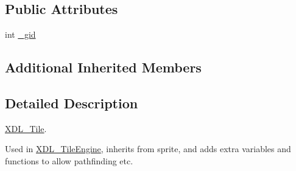 \subsection*{Public Attributes}
\begin{DoxyCompactItemize}
\item 
int \hyperlink{class_x_d_l___tile_aeb90ee0ab5ad7a0d061fd0e56bbbcee6}{\-\_\-gid}
\end{DoxyCompactItemize}
\subsection*{Additional Inherited Members}


\subsection{Detailed Description}
\hyperlink{class_x_d_l___tile}{X\-D\-L\-\_\-\-Tile}. 

Used in \hyperlink{class_x_d_l___tile_engine}{X\-D\-L\-\_\-\-Tile\-Engine}, inherits from sprite, and adds extra variables and functions to allow pathfinding etc. 

